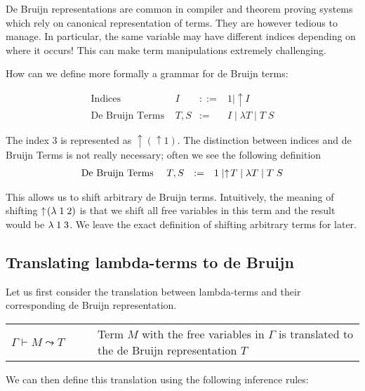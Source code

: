 De Bruijn representations are common in compiler and theorem proving
systems which rely on canonical representation of terms. They are
however tedious to manage. In particular, the same variable may have
different indices depending on where it occurs! This can make term
manipulations extremely challenging.

How can we define more formally a grammar for de Bruijn terms:

\newcommand{\shift}{\uparrow\!}
\newcommand{\app}{}

\[
\begin{array}{llcl}
\mbox{Indices}            & I    & ::= & 1 \mid \shift I \\
\mbox{De Bruijn Terms   } & T, S & := & I \mid \lambda T \mid \app T\;S 
\end{array}
\]

The index $3$ is represented as $\shift (\shift 1)$. The distinction
between indices and de Bruijn Terms is not really necessary; often we
see the following definition
\[
\begin{array}{llcl}
\mbox{De Bruijn Terms   } & T, S & := & 1 \mid \shift T \mid \lam T \mid \app T\;S 
\end{array}
\]

This allows us to shift arbitrary de Bruijn terms. Intuitively, the
meaning of shifting $\shift (\lam \;1\;2)$ is that we shift all free
variables in this term and the result would be $\lambda \;1\;3$. We leave
the exact definition of shifting arbitrary terms for later.


\subsection*{Translating lambda-terms to de Bruijn}

Let us first consider the translation between lambda-terms and their
corresponding de Bruijn representation.

\begin{center}
\begin{tabular}{lp{9cm}}
$  \Gamma \vdash M \leadsto T\quad\quad$ & Term $M$ with the free variables
    in $\Gamma$ is translated to the de Bruijn representation $T$
\end{tabular}  
\end{center}

We can then define this translation using the following inference rules:


